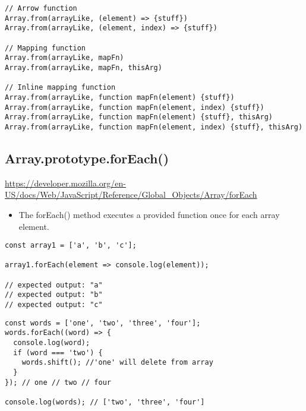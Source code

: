 \documentclass[10pt]{article}
\begin{document}
\begin{lstlisting}[title=Examples from(), captionpos=t]
// Arrow function
Array.from(arrayLike, (element) => {stuff})
Array.from(arrayLike, (element, index) => {stuff})

// Mapping function
Array.from(arrayLike, mapFn)
Array.from(arrayLike, mapFn, thisArg)

// Inline mapping function
Array.from(arrayLike, function mapFn(element) {stuff})
Array.from(arrayLike, function mapFn(element, index) {stuff})
Array.from(arrayLike, function mapFn(element) {stuff}, thisArg)
Array.from(arrayLike, function mapFn(element, index) {stuff}, thisArg)
\end{lstlisting}


\medskip %










\medskip %
\pagebreak
\subsection{Array.prototype.forEach()}

\url{https://developer.mozilla.org/en-US/docs/Web/JavaScript/Reference/Global_Objects/Array/forEach}


\begin{itemize}
	\item The forEach() method executes a provided function once for each array element.

\end{itemize}

\begin{lstlisting}[title=Example forEach(), captionpos=t]
const array1 = ['a', 'b', 'c'];

array1.forEach(element => console.log(element));

// expected output: "a"
// expected output: "b"
// expected output: "c"
\end{lstlisting}

\begin{lstlisting}[title=Examples forEach(), captionpos=t]
const words = ['one', 'two', 'three', 'four'];
words.forEach((word) => {
  console.log(word);
  if (word === 'two') {
    words.shift(); //'one' will delete from array
  }
}); // one // two // four

console.log(words); // ['two', 'three', 'four']
\end{lstlisting}
\end{document}

